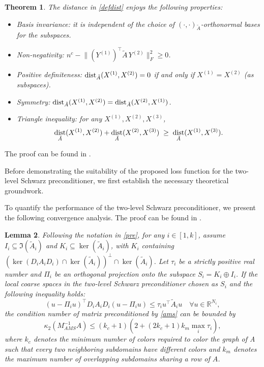 \documentclass{article}
\DeclareMathOperator{\Dist}{dist}
\DeclarePairedDelimiter{\RoundBrackets}{(}{)}
\newtheorem{theorem}{Theorem}[section]
\newtheorem{lemma}[theorem]{Lemma}
\theoremstyle{definition}
\theoremstyle{remark}
\begin{document}
\begin{theorem}
The distance in \cref{defdist} enjoys the following properties:
\begin{itemize}
  \item Basis invariance: it is independent of the choice of $(\cdot,\cdot)_{\tilde{A}}$-orthonormal bases for the subspaces.
  \item Non-negativity: $n^{c} - \bigl\|(Y^{(1)})^{\intercal}\tilde{A}\,Y^{(2)}\bigr\|_{F}^{2} \ge 0$.
  \item Positive definiteness: $\Dist_{\tilde{A}}\RoundBrackets{X^{(1)},X^{(2)}}=0$ if and only if $X^{(1)}=X^{(2)}$ (as subspaces).
  \item Symmetry: $\Dist_{\tilde{A}}\RoundBrackets{X^{(1)},X^{(2)}}=\Dist_{\tilde{A}}\RoundBrackets{X^{(2)},X^{(1)}}$.
  \item Triangle inequality: for any $X^{(1)},X^{(2)},X^{(3)}$,
  \[
    \Dist_{\tilde{A}}\RoundBrackets{X^{(1)},X^{(2)}}
    + \Dist_{\tilde{A}}\RoundBrackets{X^{(2)},X^{(3)}}
    \;\ge\;
    \Dist_{\tilde{A}}\RoundBrackets{X^{(1)},X^{(3)}}.
  \]
\end{itemize}
\end{theorem}
The proof can be found in \cite{liu2024learning}.

Before demonstrating the suitability of the proposed loss function for the two-level Schwarz preconditioner, we first establish the necessary theoretical groundwork. 

To quantify the performance of the two-level Schwarz preconditioner, we present the following convergence analysis. The proof can be found in \cite{ADD,ADDThm}.

\begin{lemma}\label{cond}
    Following the notation in \cref{pre}, for any $i \in [1,k]$, assume $I_i \subseteq \Im(\tilde A_i)$ and $K_i \subseteq \ker(\tilde A_i)$, with $K_i$ containing $(\ker(D_i A_i D_i)\cap \ker(\tilde A_i))^{\perp} \cap \ker(\tilde A_i)$. 
    Let $\tau_i$ be a strictly positive real number and $\Pi_i$ be an orthogonal projection onto the subspace $S_i = K_i \oplus I_i$. 
    If the local coarse spaces in the two-level Schwarz preconditioner chosen as $S_i$ and the following inequality holds:
\begin{equation}
    (u - \Pi_i u)^\top D_i A_i D_i (u - \Pi_i u) \leq \tau_i u^\top \tilde A_i u \quad \forall u \in \mathbb{R}^{N_i},
\end{equation}
    the condition number of matrix preconditioned by \cref{ams} can be bounded by
\begin{equation}\label{bound}
    \kappa_2(M_{AMS}^{-1} A) \leq (k_c + 1)\left(2 + (2k_c + 1) k_m \max_i \tau_i\right),
\end{equation}
where $k_c$ denotes the minimum number of colors required to color the graph of A such that every two neighboring subdomains have different colors and $k_m$ denotes the maximum number of overlapping subdomains sharing a row of $A$.
\end{lemma}
\end{document}
